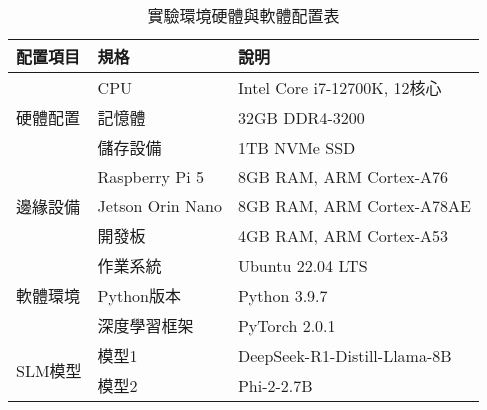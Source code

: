 \begin{table}[h]
\centering
\caption[實驗環境配置]{實驗環境硬體與軟體配置表}
\label{table:experiment_env}
\begin{tabular}{lll}
\toprule[1.1pt]
配置項目 & 規格 & 說明\\
\midrule[1.1pt]
\multirow{3}{*}{硬體配置} & CPU & Intel Core i7-12700K, 12核心\\
& 記憶體 & 32GB DDR4-3200\\
& 儲存設備 & 1TB NVMe SSD\\
\midrule[1.1pt]
\multirow{3}{*}{邊緣設備} & Raspberry Pi 5 & 8GB RAM, ARM Cortex-A76\\
& Jetson Orin Nano & 8GB RAM, ARM Cortex-A78AE\\
& 開發板 & 4GB RAM, ARM Cortex-A53\\
\midrule[1.1pt]
\multirow{3}{*}{軟體環境} & 作業系統 & Ubuntu 22.04 LTS\\
& Python版本 & Python 3.9.7\\
& 深度學習框架 & PyTorch 2.0.1\\
\midrule[1.1pt]
\multirow{2}{*}{SLM模型} & 模型1 & DeepSeek-R1-Distill-Llama-8B\\
& 模型2 & Phi-2-2.7B\\
\bottomrule[1.1pt]
\end{tabular}
\end{table} 